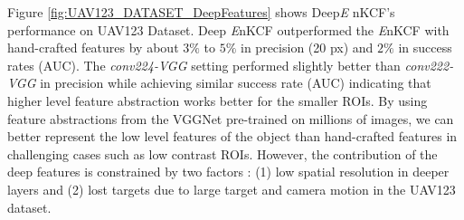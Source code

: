 \documentclass[10pt,twocolumn,letterpaper]{article}
\begin{document}

Figure \ref{fig:UAV123_DATASET_DeepFeatures} shows
Deep{\it E }nKCF's performance on UAV123 Dataset. Deep{\it
  E}nKCF outperformed the {\it E}nKCF with hand-crafted features
by about $3\%$ to $5\%$ in precision (20 px) and $2\%$ in success
rates (AUC). The \textit{conv224-VGG} setting performed slightly
better than \textit{conv222-VGG} in precision while achieving similar
success rate (AUC) indicating that higher level feature abstraction
works better for the smaller ROIs. By using feature abstractions
from the VGGNet pre-trained on millions of images, we can better represent
the low level features of the object than hand-crafted features
in challenging cases such as low contrast ROIs. However, the contribution 
of the deep features is constrained by two factors : (1) low spatial resolution in deeper layers and (2) 
lost targets due to large target and camera motion in the UAV123 dataset.
\end{document}
